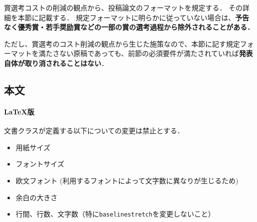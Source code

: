 \documentclass[
  platex, dvipdfmx,  %
]{nlp2021}
\newcommand{\code}[1]{\texttt{#1}}
\begin{document}
賞選考コストの削減の観点から、投稿論文のフォーマットを規定する．
その詳細を本節に記載する．
規定フォーマットに明らかに従っていない場合は、\textbf{予告なく優秀賞・若手奨励賞などの一部の賞の選考過程から除外されることがある．}

ただし、賞選考のコスト削減の観点から生じた施策なので、本節に記す規定フォーマットを満たさない原稿であっても、前節の必須要件が満たされていれば\textbf{発表自体が取り消されることはない}．



\subsection{本文}

\paragraph{LaTeX版}
文書クラスが定義する以下についての変更は禁止とする．
\begin{itemize}
\item 用紙サイズ
\item フォントサイズ
\item 欧文フォント (利用するフォントによって文字数に異なりが生じるため)
\item 余白の大きさ
\item 行間、行数、文字数（特に\code{baselinestretch}を変更しないこと）
\end{itemize}
\end{document}

